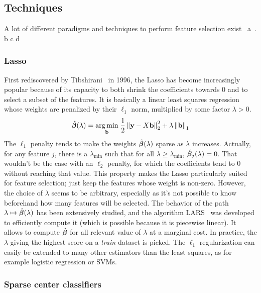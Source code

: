 \subsection{Techniques}\label{subsec:fst}

A lot of different paradigms and techniques to perform feature selection exist~\cite{intro_fs}
a~\cite{fs_text_classification}.
b\cite{gene_selection_cancer_svm}
c\cite{fs_for_classification}
d\cite{fs_for_classification_a_review}

\subsubsection{Lasso}\label{subsubsec:lasso}

First rediscovered by Tibshirani~\cite{lasso} in 1996,
the Lasso has become increasingly popular because of its capacity to both shrink
the coefficients towards 0 and to select a subset of the features.
It is basically a linear least squares regression whose weights are penalized by their $\ell_1$ norm,
multiplied by some factor $\lambda > 0$.
%
\begin{equation}\label{eq:lasso}
    \hat{\bm{\beta}}(\lambda) =
    \underset{\mathbf{b}}{\operatorname*{arg\,min}}\;
    \frac{1}{2}\left\lVert\mathbf{y} - X\mathbf{b}\right\rVert_2^2 + \lambda\left\lVert\mathbf{b}\right\rVert_1
\end{equation}
%
The $\ell_1$ penalty tends to make the weights $\hat{\bm{\beta}}(\lambda)$ sparse as $\lambda$ increases.
Actually, for any feature $j$,
there is a $\lambda_{\min}$ such that for all $\lambda \geq \lambda_{\min}$,
$\hat{\bm{\beta}}_j(\lambda) = 0$.
That wouldn't be the case with an $\ell_2$ penalty,
for which the coefficients tend to $0$ without reaching that value.
This property makes the Lasso particularly suited for feature selection;
just keep the features whose weight is non-zero.
However, the choice of $\lambda$ seems to be arbitrary,
especially as it's not possible to know beforehand how many features will be selected.
The behavior of the path $\lambda \mapsto \hat{\bm{\beta}}(\lambda)$ has been extensively studied,
and the algorithm LARS~\cite{lars} was developed to efficiently compute it
(which is possible because it is piecewise linear).
It allows to compute $\hat{\bm{\beta}}$ for all relevant value of $\lambda$ at a marginal cost.
In practice, the $\lambda$ giving the highest score on a \emph{train} dataset is picked.
The $\ell_1$ regularization can easily be extended to many other estimators than the least squares,
as for example logistic regression or SVMs.

\subsubsection{Sparse center classifiers}

